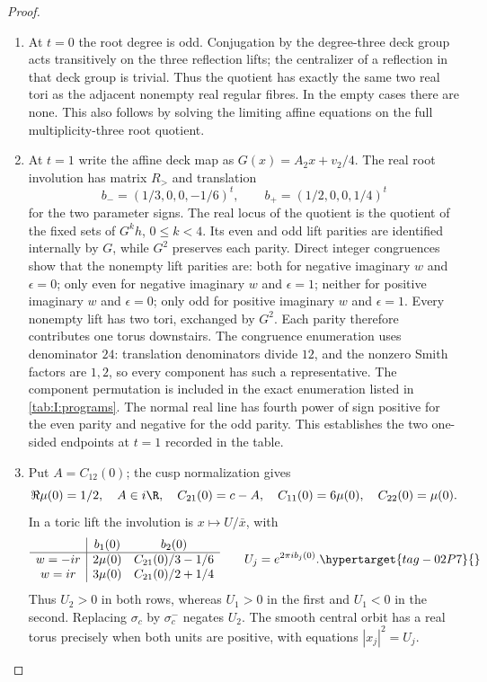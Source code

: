 \begin{proof}
\begin{enumerate}[label=\arabic*.,leftmargin=*]
\item At $t=0$ the root degree is odd. Conjugation by the degree-three deck
group acts transitively on the three reflection lifts; the centralizer
of a reflection in that deck group is trivial.
Thus the quotient has exactly the same two real tori as the adjacent
nonempty real regular fibres. In the empty cases there are none. This
also follows by solving the limiting affine equations on the full
multiplicity-three root quotient.

\item At $t=1$ write the affine deck map as
$G(x)=A_2x+v_2/4$. The real root involution has matrix $R_>$ and
translation
\[
 b_-=(1/3,0,0,-1/6)^t,
 \qquad b_+=(1/2,0,0,1/4)^t
\]
for the two parameter signs. The real locus of the quotient is the
quotient of the fixed sets of $G^kh$, $0\leq k<4$. Its even and odd
lift parities are identified internally by $G$, while $G^2$ preserves
each parity. Direct integer congruences show that the nonempty lift
parities are: both for negative imaginary $w$ and $\epsilon=0$; only even for
negative imaginary $w$ and $\epsilon=1$; neither for positive imaginary $w$ and $\epsilon=0$;
only odd for positive imaginary $w$ and $\epsilon=1$. Every nonempty lift has
two tori, exchanged by $G^2$. Each parity therefore contributes one
torus downstairs. The congruence enumeration uses denominator $24$:
translation denominators divide $12$, and the nonzero Smith factors are
$1,2$, so every component has such a representative. The component
permutation is included in the exact enumeration listed in
\cref{tab:I:programs}. The normal
real line has fourth power of sign positive for the even parity and
negative for the odd parity. This establishes the two one-sided
endpoints at $t=1$ recorded in the table.

\item  Put
$A=C_{12}(0)$; the cusp normalization gives
\[
 \Re\mu(0)=1/2,\quad A\in i\R,\quad C_{21}(0)=c-A,
 \quad C_{11}(0)=6\mu(0),\quad C_{22}(0)=\mu(0).
\]
In a toric lift the involution is
$x\mapsto U/\bar x$, with
\begin{equation}
\begin{array}{c|cc}
 &b_1(0)&b_2(0)\\\hline
 w=-ir&2\mu(0)&C_{21}(0)/3-1/6\\
 w=ir&3\mu(0)&C_{21}(0)/2+1/4
\end{array}
\qquad U_j=e^{2\pi i b_j(0)}.
\hypertarget{tag-02P7}{}\label{mapsI:real-eq-7}
\end{equation}
Thus $U_2>0$ in both rows, whereas $U_1>0$ in the first and $U_1<0$
in the second. Replacing $\sigma_c$ by $\sigma_c^-$ negates $U_2$.
The smooth central orbit has a real torus precisely when both units
are positive, with equations $|x_j|^2=U_j$.


\end{enumerate}
\end{proof}
